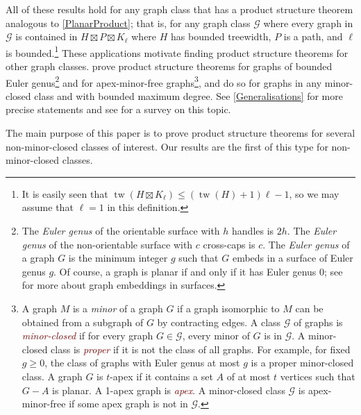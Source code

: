 \documentclass{patmorin}
\newcommand{\defin}[1]{\textcolor{Maroon}{\emph{#1}}}
\newcommand{\note}[2]{\noindent{\color{red}[#1:~#2]}}
\DeclareMathOperator{\tw}{tw}
\renewcommand{\geq}{\geqslant}
\renewcommand{\leq}{\leqslant}
\begin{document}


All of these results hold for any graph class that has a product structure theorem analogous to \cref{PlanarProduct}; that is, for any graph class  $\mathcal{G}$ where every graph in $\mathcal{G}$ is contained in $H\boxtimes P\boxtimes K_\ell$ where $H$ has bounded treewidth, $P$ is a path, and $\ell$ is bounded.\footnote{It is easily seen that $\tw(H\boxtimes K_\ell) \leq (\tw(H)+1)\ell-1$, so we may assume that $\ell=1$ in this definition.} These applications motivate finding product structure theorems for other graph classes. \citet{DJMMUW20} prove product structure theorems for graphs of bounded Euler genus\footnote{The \textit{Euler genus} of the orientable surface with $h$ handles is $2h$. The \textit{Euler genus} of the non-orientable surface with $c$ cross-caps is $c$. The \textit{Euler genus} of a graph $G$ is the minimum integer $g$ such that $G$ embeds in a surface of Euler genus $g$. Of course, a graph is planar if and only if it has Euler genus 0; see \citep{mohar.thomassen:graphs} for more about graph embeddings in surfaces.} and for apex-minor-free graphs\footnote{A graph $M$ is a \textit{minor} of a graph $G$ if a graph isomorphic to $M$ can be obtained from a subgraph of $G$ by contracting edges. A class $\mathcal{G}$ of graphs is \defin{minor-closed} if for every graph $G\in\mathcal{G}$, every minor of $G$ is in $\mathcal{G}$. A minor-closed class is \defin{proper} if it is not the class of all graphs. For example, for fixed $g\geq 0$, the class of graphs with Euler genus at most $g$ is a proper minor-closed class. A graph $G$ is $t$-apex if it contains a set $A$ of at most $t$ vertices such that $G-A$ is planar. A 1-apex graph is \defin{apex}.  A minor-closed class $\mathcal{G}$ is apex-minor-free if some apex graph is not in $\mathcal{G}$.}, and \citet{DEMWW22} do so for graphs in any minor-closed class and with bounded maximum degree. See \cref{Generalisations} for more precise statements and see \citep{DHJLW21} for a survey on this topic.

The main purpose of this paper is to prove product structure theorems for several non-minor-closed classes of interest. Our results are the first of this type for non-minor-closed classes.
\end{document}
